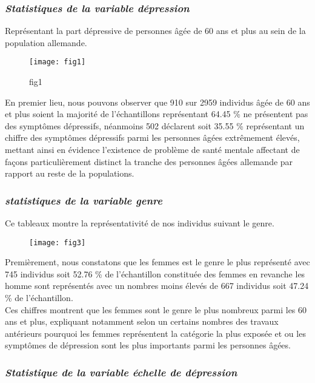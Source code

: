 \documentclass[a4paper]{article}
\begin{document}
\subsubsection{\textit{Statistiques de la variable dépression}}
	Représentant la part dépressive de personnes âgée de 60 ans et plus au sein de la population allemande.
	
	\begin{figure}[h!]
		\centering
		\texttt{[image: fig1]}
		\caption{fig1}
		\label{fig1:la variable dépression}
	\end{figure}
	
	En premier lieu, nous pouvons observer que 910 sur 2959 individus âgée de 60 ans et plus soient la majorité de l’échantillons représentant 64.45 \% ne présentent pas des symptômes dépressifs, néanmoins 502 déclarent soit 35.55 \% représentant un chiffre des symptômes dépressifs parmi les personnes âgées extrêmement élevés, mettant ainsi en évidence l’existence de problème de santé mentale affectant de façons particulièrement distinct la tranche des personnes âgées allemande par rapport au reste de la populations.\\

	\subsubsection{\textit{statistiques de la variable genre}}
	
	Ce tableaux montre la représentativité de nos individus suivant le genre.
	
	\begin{figure}[h!]
		\centering
		\texttt{[image: fig3]}
		\caption{}
		\label{la variable genre}
	\end{figure}
	
	Premièrement, nous constatons que les femmes est le genre le plus représenté avec 745 individus soit 52.76 \% de l’échantillon constituée des femmes en revanche les homme sont représentés avec un nombres moins élevés de 667 individus soit 47.24 \% de l'échantillon.\\
	 Ces chiffres montrent que les femmes sont le genre le plus nombreux parmi les 60 ans et plus, expliquant notamment selon un certains nombres des travaux antérieurs pourquoi  les femmes représentent la catégorie la plus exposée et ou les symptômes de dépression sont les plus importants parmi les personnes âgées.\\
	
	\subsubsection{\textit{Statistique de la variable échelle de dépression }}
	
\end{document}
